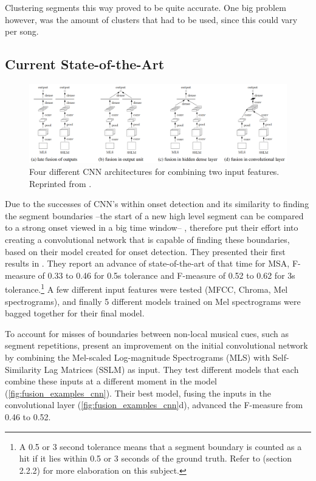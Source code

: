 Clustering segments this way proved to be quite accurate. One big problem however, was the amount of clusters that had to be used, since this could vary per song.

\subsection{Current State-of-the-Art}
\begin{figure}[t]
    \centering
    \includegraphics[width=1\textwidth]{images/fusion_examples_cnn}
    \caption{Four different CNN architectures for combining two input features.\\
    Reprinted from \textcite{Grill2015music}.}
    \label{fig:fusion_examples_cnn}
\end{figure}
Due to the successes of CNN's within onset detection and its similarity to finding the segment boundaries --the start of a new high level segment can be compared to a strong onset viewed in a big time window-- , \citeauthor{Ullrich2014boundary} therefore put their effort into creating a convolutional network that is capable of finding these boundaries, based on their model created for onset detection. They presented their first results in \citeyear{Ullrich2014boundary} \cite{Ullrich2014boundary}. They report an advance of state-of-the-art of that time for MSA, F-measure of 0.33 to 0.46 for 0.5s tolerance and F-measure of 0.52 to 0.62 for 3s tolerance.\footnote{A 0.5 or 3 second tolerance means that a segment boundary is counted as a hit if it lies within 0.5 or 3 seconds of the ground truth. Refer to \textcite{Jesperthesis} (section 2.2.2) for more elaboration on this subject.} A few different input features were tested (MFCC, Chroma, Mel spectrograms), and finally 5 different models trained on Mel spectrograms were bagged \cite{Breiman1996bagging} together for their final model.

To account for misses of boundaries between non-local musical cues, such as segment repetitions, \textcite{Grill2015music} present an improvement on the initial convolutional network by combining the Mel-scaled Log-magnitude Spectrograms (MLS) with Self-Similarity Lag Matrices (SSLM) as input. They test different models that each combine these inputs at a different moment in the model (\autoref{fig:fusion_examples_cnn}). Their best model, fusing the inputs in the convolutional layer (\autoref{fig:fusion_examples_cnn}d), advanced the F-measure from 0.46 \cite{Ullrich2014boundary} to 0.52.

